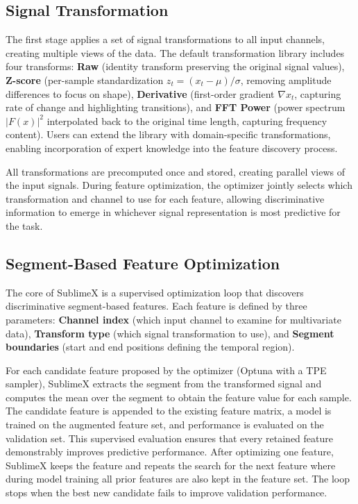 \documentclass[times, review, 10pt]{elsarticle}
\begin{document}
\subsection{Signal Transformation}
The first stage applies a set of signal transformations to all input channels, creating
multiple views of the data. The default transformation library includes four transforms:
\textbf{Raw} (identity transform preserving the original signal values), \textbf{Z-score}
(per-sample standardization $z_t = (x_t - \mu) / \sigma$, removing amplitude differences to
focus on shape), \textbf{Derivative} (first-order gradient $\nabla x_t$, capturing rate of
change and highlighting transitions), and \textbf{FFT Power} (power spectrum $|F(x)|^2$
interpolated back to the original time length, capturing frequency content). Users can extend
the library with domain-specific transformations, enabling incorporation of expert knowledge into the feature discovery process.

All transformations are precomputed once and stored, creating parallel views of the input signals. During feature optimization, the optimizer jointly selects which transformation and
channel to use for each feature, allowing discriminative information to emerge in whichever signal representation is most predictive for the task.

\subsection{Segment-Based Feature Optimization}
The core of SublimeX is a supervised optimization loop that discovers discriminative segment-based features. Each feature is defined by three
parameters: \textbf{Channel index} (which input channel to examine for multivariate data), \textbf{Transform type} (which signal transformation to
use), and \textbf{Segment boundaries} (start and end positions defining the temporal region).

For each candidate feature proposed by the optimizer (Optuna with a TPE sampler), SublimeX extracts the segment from the transformed signal and
computes the mean over the segment to obtain the feature value for each sample.
The candidate feature is appended to the existing feature matrix, a model is trained on the augmented feature set, and performance is evaluated on the validation set. 
This supervised evaluation ensures that every retained feature demonstrably improves predictive performance. 
After optimizing one feature, SublimeX keeps the feature and repeats the search for the next feature where during model training all prior features are also kept in the feature set. 
The loop stops when the best new candidate fails to improve validation performance. 
\end{document}
